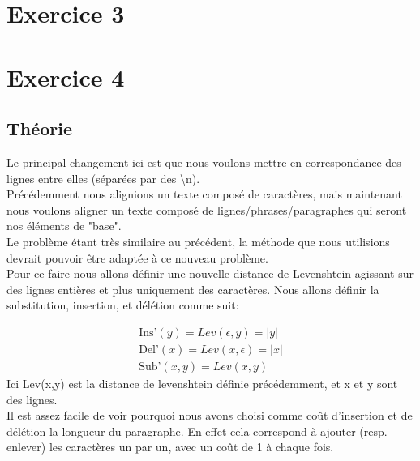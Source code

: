\documentclass{article}
\begin{document}
\section{Exercice 3}


\section{Exercice 4}
\subsection{Théorie}
Le principal changement ici est que nous voulons mettre en correspondance des
lignes entre elles (séparées par des \textbackslash{}n).\\
Précédemment nous alignions un texte composé de caractères, mais maintenant nous
voulons aligner un texte composé de lignes/phrases/paragraphes qui seront nos
éléments de "base".\\

Le problème étant très similaire au précédent, la méthode que nous utilisions
devrait pouvoir être adaptée à ce nouveau problème.\\
Pour ce faire nous allons définir une nouvelle distance de Levenshtein agissant sur
des lignes entières et plus uniquement des caractères.
Nous allons définir la substitution, insertion, et délétion comme suit:

\begin{gather*}
	\text{Ins'}(y) = Lev(\epsilon,y) = \lvert y \rvert\\
	\text{Del'}(x) = Lev(x,\epsilon) = \lvert x \rvert\\
	\text{Sub'}(x,y) = Lev(x,y)
\end{gather*}
Ici Lev(x,y) est la distance de levenshtein définie précédemment, et x et y
sont des lignes.\\

Il est assez facile de voir pourquoi nous avons choisi comme coût d'insertion
et de délétion la longueur du paragraphe. En effet cela correspond à ajouter
(resp. enlever) les caractères un par un, avec un coût de 1 à chaque fois.\\
\end{document}

